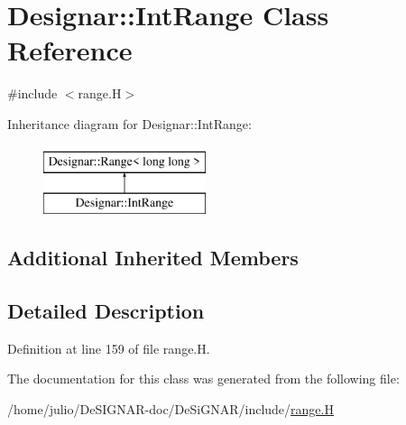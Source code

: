 \hypertarget{class_designar_1_1_int_range}{}\section{Designar\+:\+:Int\+Range Class Reference}
\label{class_designar_1_1_int_range}


{\ttfamily \#include $<$range.\+H$>$}

Inheritance diagram for Designar\+:\+:Int\+Range\+:\begin{figure}[H]
\begin{center}
\leavevmode
\includegraphics[height=2.000000cm]{class_designar_1_1_int_range}
\end{center}
\end{figure}
\subsection*{Additional Inherited Members}


\subsection{Detailed Description}


Definition at line 159 of file range.\+H.



The documentation for this class was generated from the following file\+:\begin{DoxyCompactItemize}
\item 
/home/julio/\+De\+S\+I\+G\+N\+A\+R-\/doc/\+De\+Si\+G\+N\+A\+R/include/\hyperlink{range_8_h}{range.\+H}\end{DoxyCompactItemize}
